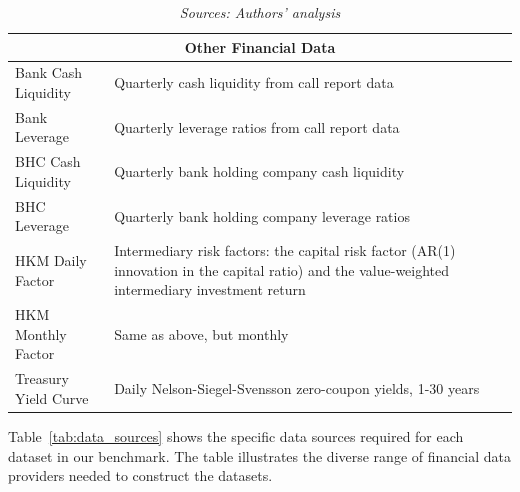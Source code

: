 \documentclass{article}
\newcommand{\floatsource}[1]{\caption*{\footnotesize\emph{#1}}}
\begin{document}
\begin{table}[htbp]
\begin{tabular}{p{3cm}p{6cm}p{3.5cm}}
\midrule
\multicolumn{3}{c}{\textbf{Other Financial Data}} \\
\midrule
Bank Cash Liquidity & Quarterly cash liquidity from call report data & \cite{Drechsler2017} \\
Bank Leverage & Quarterly leverage ratios from call report data & \cite{Drechsler2017} \\
BHC Cash Liquidity & Quarterly bank holding company cash liquidity & \cite{Drechsler2017} \\
BHC Leverage & Quarterly bank holding company leverage ratios & \cite{Drechsler2017} \\
HKM Daily Factor & Intermediary risk factors: the capital risk factor (AR(1) innovation in the capital ratio) and the value-weighted intermediary investment return & \cite{He2017} \\
HKM Monthly Factor & Same as above, but monthly & \cite{He2017} \\
Treasury Yield Curve & Daily Nelson-Siegel-Svensson zero-coupon yields, 1-30 years & \cite{Gurkaynak2007} \\
\bottomrule
\end{tabular}
\floatsource{Sources: Authors' analysis}
\end{table}

Table~\ref{tab:data_sources} shows the specific data sources required for each dataset in our benchmark. The table illustrates the diverse range of financial data providers needed to construct the datasets.
\end{document}
